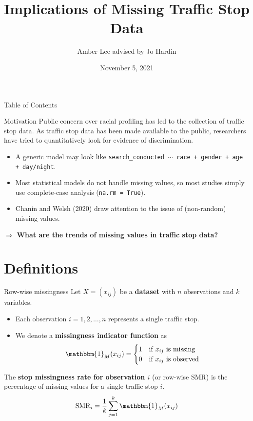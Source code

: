 \documentclass[11pt]{beamer}
\title[Implications of Missing Traffic Stop Data]{Implications of Missing Traffic Stop Data}
\author{Amber Lee advised by Jo Hardin}
\institute[]{Pomona College}
\date{November 5, 2021}
\newcommand{\indic}{\mathbbm{1}_M}
\newcommand{\SMR}{\mathrm{SMR}}
\begin{document}

\maketitle

\begin{frame}{Table of Contents}
\tableofcontents
\end{frame}

\begin{frame}{Motivation}
    Public concern over racial profiling has led to the collection of traffic stop data. As traffic stop data has been made available to the public, researchers have tried to quantitatively look for evidence of discrimination. \pause
    \begin{itemize}
    \item A generic model may look like \texttt{search\_conducted $\sim$ race + gender + age + day/night}.
    \item Most statistical models do not handle missing values, so most studies simply use complete-case analysis (\texttt{na.rm = True}).
    \item Chanin and Welsh (2020) draw attention to the issue of (non-random) missing values.
    \end{itemize} \pause
    $\Rightarrow$ {\bf{What are the trends of missing values in traffic stop data?}}
\end{frame}

\section{Definitions}

\begin{frame}{Row-wise missingness} %
    Let $X = (x_{ij})$ be a {\bf{dataset}} with $n$ observations and $k$ variables. 
    \begin{itemize}
    \item Each observation $i = 1, 2, \ldots, n$ represents a single traffic stop. 
    \item We denote a {\bf{missingness indicator function}} as
    \begin{equation*}
    \indic(x_{ij}) =
    \begin{cases}
    1 & \text{if $x_{ij}$ is missing} \\
    0 & \text{if $x_{ij}$ is observed}
    \end{cases}
    \end{equation*}
    \end{itemize} \pause
    \begin{definition}
    The {\bf{stop missingness rate for observation $i$}} (or row-wise $\SMR$) is the percentage of missing values for a single traffic stop $i$. 
    \begin{equation*}
    \SMR_i = \dfrac{1}{k} \sum_{j = 1}^{k} \indic(x_{ij})
    \end{equation*}
    \end{definition}
\end{frame}
\end{document}
